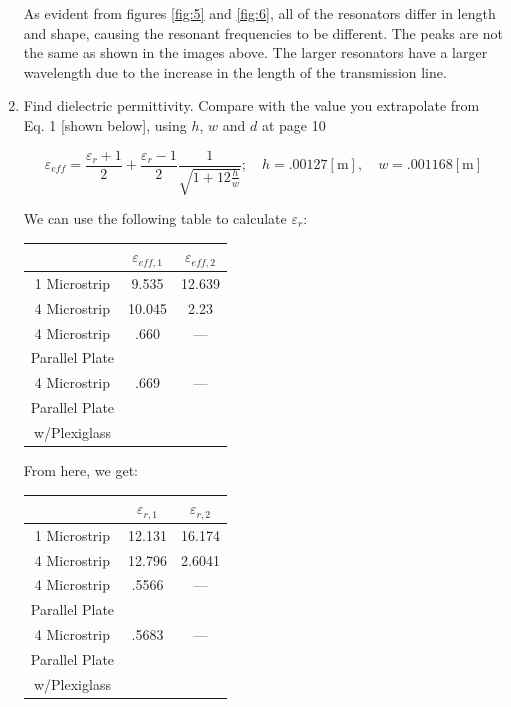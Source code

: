 \documentclass[
	letterpaper, %
	10pt, %
]{CSUniSchoolLabReport}
\begin{document}
\begin{enumerate}
    As evident from figures \ref{fig:5} and \ref{fig:6}, all of the resonators differ in length and shape, causing the resonant frequencies to be different. The peaks are not the same as shown in the images above. The larger resonators have a larger wavelength due to the increase in the length of the transmission line.

  \item Find dielectric permittivity. Compare with the value you extrapolate from Eq. 1 [shown below], using $h$, $w$ and $d$ at page 10

    $$\varepsilon_{eff}=\frac{\varepsilon_r+1}{2}+\frac{\varepsilon_r-1}{2}\frac{1}{\sqrt{1+12\frac{h}{w}}};\quad h=.00127[\si{\meter}],\quad w=.001168[\si{\meter}]$$

    We can use the following table to calculate $\varepsilon_r$:

  \begin{center}
    \begin{tabular}[H]{|c|c|c|}
     \hline
     & $\varepsilon_{eff,1}$ & $\varepsilon_{eff,2}$\\
     \hline
     1 Microstrip & 9.535 & 12.639 \\
     \hline
     4 Microstrip & 10.045 & 2.23 \\
     \hline
     4 Microstrip & .660 & — \\
     Parallel Plate & & \\
     \hline
     4 Microstrip & .669 & —  \\
     Parallel Plate & & \\
     w/Plexiglass & & \\
     \hline
    \end{tabular}
  \end{center}

  From here, we get:

  \begin{center}
    \begin{tabular}[H]{|c|c|c|}
     \hline
     & $\varepsilon_{r,1}$ & $\varepsilon_{r,2}$\\
     \hline
     1 Microstrip & 12.131 & 16.174 \\
     \hline
     4 Microstrip & 12.796 & 2.6041 \\
     \hline
     4 Microstrip & .5566 & — \\
     Parallel Plate & & \\
     \hline
     4 Microstrip & .5683 & —  \\
     Parallel Plate & & \\
     w/Plexiglass & & \\
     \hline
    \end{tabular}
  \end{center}


\end{enumerate}
\end{document}
